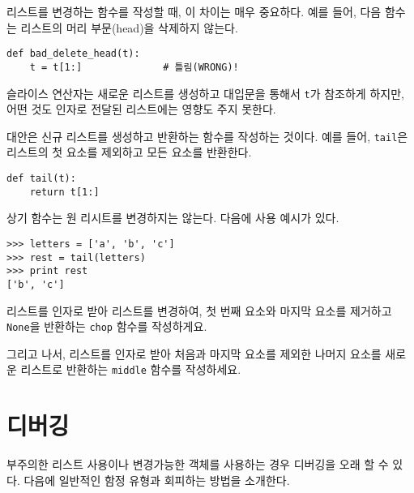 리스트를 변경하는 함수를 작성할 때, 이 차이는 매우 중요하다.
예를 들어, 다음 함수는 리스트의 머리 부문(head)을 삭제하지 않는다.

\beforeverb
\begin{verbatim}
def bad_delete_head(t):
    t = t[1:]              # 틀림(WRONG)!
\end{verbatim}
\afterverb

슬라이스 연산자는 새로운 리스트를 생성하고 대입문을 통해서 {\tt t}가 참조하게 하지만, 어떤 것도 인자로 전달된 리스트에는 영향도 주지 못한다.


대안은 신규 리스트를 생성하고 반환하는 함수를 작성하는 것이다. 
예를 들어, {\tt tail}은 리스트의 첫 요소를 제외하고 모든 요소를 반환한다.

\beforeverb
\begin{verbatim}
def tail(t):
    return t[1:]
\end{verbatim}
\afterverb
%

상기 함수는 원 리시트를 변경하지는 않는다. 
다음에 사용 예시가 있다.

\beforeverb
\begin{verbatim}
>>> letters = ['a', 'b', 'c']
>>> rest = tail(letters)
>>> print rest
['b', 'c']
\end{verbatim}
\afterverb

\begin{ex}

리스트를 인자로 받아 리스트를 변경하여, 첫 번째 요소와 마지막 요소를 제거하고 {\tt None}을 반환하는 {\tt chop} 함수를 작성하게요.

그리고 나서, 리스트를 인자로 받아 처음과 마지막 요소를 제외한 나머지 요소를 새로운 리스트로 반환하는 {\tt middle} 함수를 작성하세요.

\end{ex}


\section{디버깅}

부주의한 리스트 사용이나 변경가능한 객체를 사용하는 경우 디버깅을 오래 할 수 있다.
다음에 일반적인 함정 유형과 회피하는 방법을 소개한다.

